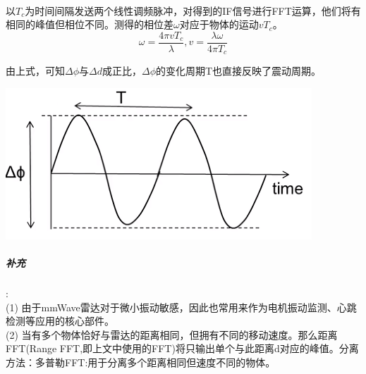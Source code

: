 \documentclass[UTF8]{ctexart}
\begin{document}
\paragraph{}以$T_c$为时间间隔发送两个线性调频脉冲，对得到的IF信号进行FFT运算，他们将有相同的峰值但相位不同。测得的相位差$\omega$对应于物体的运动$vT_c$。\\
\[\omega=\frac{4\pi v T_c}{\lambda} ,v=\frac{\lambda \omega}{4\pi T_c}\]



由上式，可知$\Delta \phi$与$\Delta d$成正比，$\Delta \phi$的变化周期T也直接反映了震动周期。

{\centering \includegraphics[width = .4\textwidth]{pic/deltaphase.png}

}

\subparagraph{补充}:\\
(1) 由于mmWave雷达对于微小振动敏感，因此也常用来作为电机振动监测、心跳检测等应用的核心部件。\\
(2) 当有多个物体恰好与雷达的距离相同，但拥有不同的移动速度。那么距离FFT(Range FFT,即上文中使用的FFT)将只输出单个与此距离d对应的峰值。分离方法：多普勒FFT:用于分离多个距离相同但速度不同的物体。
\end{document}
